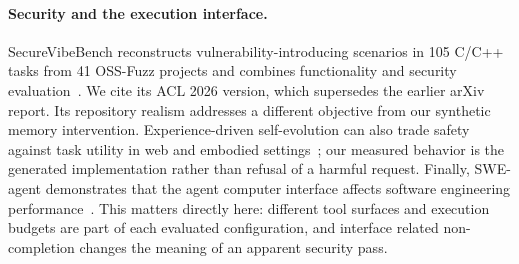 \paragraph{Security and the execution interface.}
SecureVibeBench reconstructs vulnerability-introducing scenarios in 105 C/C++ tasks from 41 OSS-Fuzz projects and combines functionality and security evaluation~\citep{securevibebench}. We cite its ACL 2026 version, which supersedes the earlier arXiv report. Its repository realism addresses a different objective from our synthetic memory intervention. Experience-driven self-evolution can also trade safety against task utility in web and embodied settings~\citep{experience_safety}; our measured behavior is the generated implementation rather than refusal of a harmful request. Finally, SWE-agent demonstrates that the agent computer interface affects software engineering performance~\citep{sweagent}. This matters directly here: different tool surfaces and execution budgets are part of each evaluated configuration, and interface related non-completion changes the meaning of an apparent security pass.
